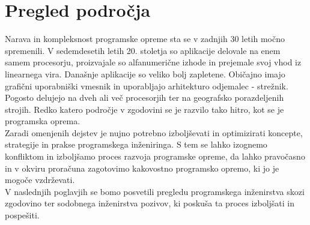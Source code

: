 \documentclass[a4paper,12pt,openright]{book}
\begin{document}
\chapter{Pregled področja} \label{chap:pregled}
Narava in kompleksnost programske opreme sta se v zadnjih 30 letih močno spremenili. V sedemdesetih letih 20. stoletja so aplikacije delovale na enem samem procesorju, proizvajale so alfanumerične izhode in prejemale svoj vhod iz linearnega vira. Današnje aplikacije so veliko bolj zapletene. Običajno imajo grafični uporabniški vmesnik in uporabljajo arhitekturo odjemalec - strežnik. Pogosto delujejo na dveh ali več procesorjih ter na geografsko porazdeljenih strojih. Redko katero področje v zgodovini se je  razvilo tako hitro, kot se je programska oprema. \cite{aggarwal2005software}
\\
Zaradi omenjenih dejstev je nujno potrebno izboljševati in optimizirati koncepte, strategije in prakse programskega inženiringa. S tem se lahko izognemo konfliktom in izboljšamo proces razvoja programske opreme, da lahko pravočasno in v okviru proračuna zagotovimo kakovostno programsko opremo, ki jo je mogoče vzdrževati. \\
V naslednjih poglavjih se bomo posvetili pregledu programskega inženirstva skozi zgodovino ter sodobnega inženirstva pozivov, ki poskuša ta proces izboljšati in pospešiti. 
\pagebreak
\end{document}
